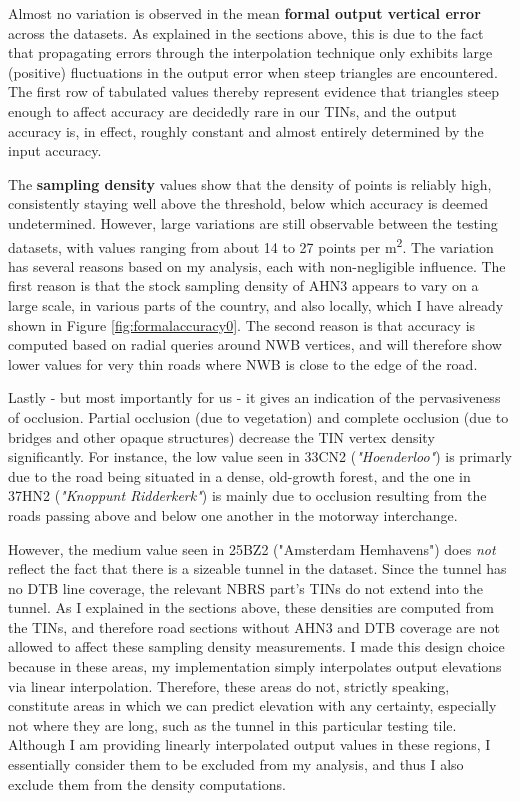 Almost no variation is observed in the mean \textbf{formal output vertical error} across the datasets. As explained in the sections above, this is due to the fact that propagating errors through the interpolation technique only exhibits large (positive) fluctuations in the output error when steep triangles are encountered. The first row of tabulated values thereby represent evidence that triangles steep enough to affect accuracy are decidedly rare in our TINs, and the output accuracy is, in effect, roughly constant and almost entirely determined by the input accuracy.

The \textbf{sampling density} values show that the density of points is reliably high, consistently staying well above the threshold, below which accuracy is deemed undetermined. However, large variations are still observable between the testing datasets, with values ranging from about 14 to 27 points per m\textsuperscript{2}. The variation has several reasons based on my analysis, each with non-negligible influence. The first reason is that the stock sampling density of AHN3 appears to vary on a large scale, in various parts of the country, and also locally, which I have already shown in Figure \ref{fig:formalaccuracy0}. The second reason is that accuracy is computed based on radial queries around NWB vertices, and will therefore show lower values for very thin roads where NWB is close to the edge of the road.

Lastly - but most importantly for us - it gives an indication of the pervasiveness of occlusion. Partial occlusion (due to vegetation) and complete occlusion (due to bridges and other opaque structures) decrease the TIN vertex density significantly. For instance, the low value seen in 33CN2 (\textit{"Hoenderloo"}) is primarly due to the road being situated in a dense, old-growth forest, and the one in 37HN2 (\textit{"Knoppunt Ridderkerk"}) is mainly due to occlusion resulting from the roads passing above and below one another in the motorway interchange.

However, the medium value seen in 25BZ2 ("Amsterdam Hemhavens") does \textit{not} reflect the fact that there is a sizeable tunnel in the dataset. Since the tunnel has no DTB line coverage, the relevant NBRS part's TINs do not extend into the tunnel. As I explained in the sections above, these densities are computed from the TINs, and therefore road sections without AHN3 and DTB coverage are not allowed to affect these sampling density measurements. I made this design choice because in these areas, my implementation simply interpolates output elevations via linear interpolation. Therefore, these areas do not, strictly speaking, constitute areas in which we can predict elevation with any certainty, especially not where they are long, such as the tunnel in this particular testing tile. Although I am providing linearly interpolated output values in these regions, I essentially consider them to be excluded from my analysis, and thus I also exclude them from the density computations.

